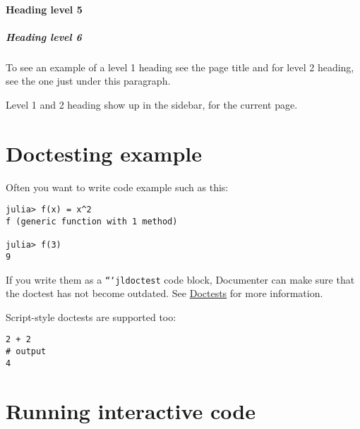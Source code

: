 \label{12782044777122551513}{}


\paragraph{Heading level 5}\indent



\label{9543099701887315540}{}


\subparagraph{Heading level 6}\indent



\label{10897944457118690625}{}


To see an example of a level 1 heading see the page title and for level 2 heading, see the one just under this paragraph.



\begin{tcolorbox}[colback=admonition-note!5!white,colframe=admonition-note!75!black,title=\textbf{Headings in sidebars}]
Level 1 and 2 heading show up in the sidebar, for the current page.

\end{tcolorbox}


\section{Doctesting example}



\label{10597583416623881668}{}


Often you want to write code example such as this:




\begin{verbatim}
julia> f(x) = x^2
f (generic function with 1 method)

julia> f(3)
9
\end{verbatim}



If you write them as a \texttt{```jldoctest} code block, Documenter can make sure that the doctest has not become outdated. See \href{@ref}{Doctests} for more information.



Script-style doctests are supported too:




\begin{verbatim}
2 + 2
# output
4
\end{verbatim}



\section{Running interactive code}



